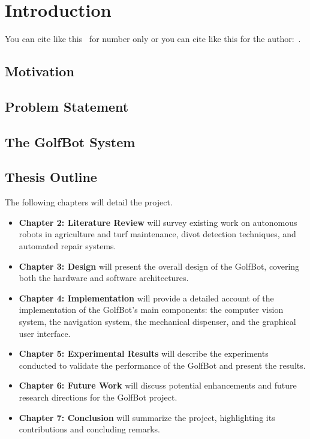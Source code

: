 \chapter{Introduction}
\label{chap:introduction}

You can cite like this~\citep{DiCarlo_2018_DynamicLocomotion} for number only or you can cite like this for the author:~\citet{DiCarlo_2018_DynamicLocomotion}.


\section{Motivation}

\section{Problem Statement}


\section{The GolfBot System}

\section{Thesis Outline}
The following chapters will detail the project.
\begin{itemize}
    \item \textbf{Chapter 2: Literature Review} will survey existing work on autonomous robots in agriculture and turf maintenance, divot detection techniques, and automated repair systems.
    \item \textbf{Chapter 3: Design} will present the overall design of the GolfBot, covering both the hardware and software architectures.
    \item \textbf{Chapter 4: Implementation} will provide a detailed account of the implementation of the GolfBot's main components: the computer vision system, the navigation system, the mechanical dispenser, and the graphical user interface.
    \item \textbf{Chapter 5: Experimental Results} will describe the experiments conducted to validate the performance of the GolfBot and present the results.
    \item \textbf{Chapter 6: Future Work} will discuss potential enhancements and future research directions for the GolfBot project.
    \item \textbf{Chapter 7: Conclusion} will summarize the project, highlighting its contributions and concluding remarks.
\end{itemize}